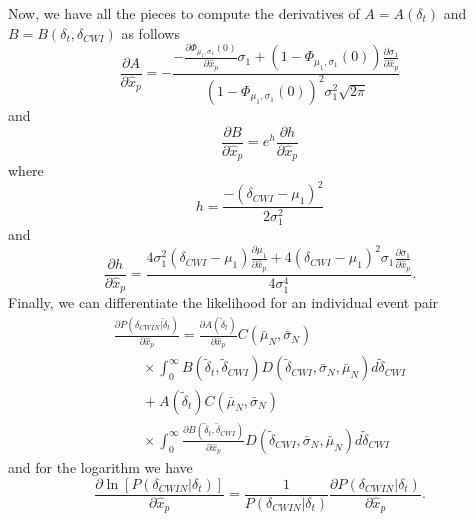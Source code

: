 \documentclass[extra]{gji}
\begin{document}
Now, we have all the pieces to compute the derivatives of $A=A(\delta_t)$ and $B = B(\delta_t,\delta_{CWI})$ as follows
\begin{equation}
\frac{\partial A} {\partial \hat{x}_p} =
-\frac{ -\frac{\partial  \Phi_{\mu_1,\sigma_1}(0)}{\partial \hat{x}_p} \sigma_1 +
 \left(1- \Phi_{\mu_1,\sigma_1}(0) \right) \frac{\partial \sigma_1}{\partial \hat{x}_p}}
{\left(1- \Phi_{\mu_1,\sigma_1}(0) \right)^2 \sigma_1^2 \sqrt{2 \pi}}
\end{equation}
and
\begin{equation}
\frac{\partial B} {\partial \hat{x}_p} = e^h \frac{\partial h}{\partial \hat{x}_p}
\end{equation}
where
\begin{equation}
h =  \frac{-(\delta_{CWI}-\mu_1)^2}{2 \sigma_1^2}
\end{equation}
and
\begin{equation}
\frac{\partial h}{\partial \hat{x}_p} = \frac{
4 \sigma_1^2 (\delta_{CWI}-\mu_1) \frac{\partial \mu_1}{\partial \hat{x}_p}
+ 4(\delta_{CWI}-\mu_1)^2 \sigma_1 \frac{\partial \sigma_1}{\partial \hat{x}_p} }
{4 \sigma_1^4}.
\end{equation}
Finally, we can differentiate the likelihood for an individual event pair
\begin{equation}
\begin{array}{l}
\frac{\partial P(\delta_{CWIN}|\widetilde{\delta}_t)} {\partial \hat{x}_p}  =
\frac{\partial A(\widetilde{\delta}_t)}{\partial \hat{x}_p} C(\bar{\mu}_N, \bar{\sigma}_N) \\
\hspace{2em} \times \int_0^\infty B(\widetilde{\delta}_t,\widetilde{\delta}_{CWI})
D(\widetilde{\delta}_{CWI},\bar{\sigma}_N,\bar{\mu}_N )
d\widetilde{\delta}_{CWI} \\
\hspace{2em} + A(\widetilde{\delta}_t) C(\bar{\mu}_N, \bar{\sigma}_N) \\
\hspace{2em} \times \int_0^\infty
\frac{\partial B(\widetilde{\delta}_t,\widetilde{\delta}_{CWI})} {\partial \hat{x}_p}
D(\widetilde{\delta}_{CWI},\bar{\sigma}_N,\bar{\mu}_N )
d\widetilde{\delta}_{CWI}
\end{array}
\end{equation}
and for the logarithm we have
\begin{equation}
\frac{ \partial \ln \left[ P(\delta_{CWIN}|\delta_t) \right] } {\partial \hat{x}_p}
= \frac{1}{P(\delta_{CWIN}|\delta_t)} \frac{\partial P(\delta_{CWIN}|\delta_t)}{\partial \hat{x}_p}.
\end{equation}
\end{document}
